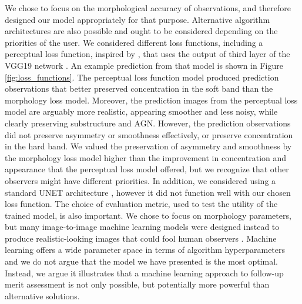 \documentclass[twocolumn, 11pt]{aastex63}%
\begin{document}
We chose to focus on the morphological accuracy of observations, and therefore designed our model appropriately for that purpose. Alternative algorithm architectures are also possible and ought to be considered depending on the priorities of the user. We considered different loss functions, including a perceptual loss function, inspired by \citet{ploss}, that uses the output of third layer of the VGG19 network \citep{VGG19}. An example prediction from that model is shown in Figure \ref{fig:loss_functions}. The perceptual loss function model produced prediction observations that better preserved concentration in the soft band than the morphology loss model. Moreover, the prediction images from the perceptual loss model are arguably more realistic, appearing smoother and less noisy, while clearly preserving substructure and AGN. However, the prediction observations did not preserve asymmetry or smoothness effectively, or preserve concentration in the hard band. We valued the preservation of asymmetry and smoothness by the morphology loss model higher than the improvement in concentration and appearance that the perceptual loss model offered, but we recognize that other observers might have different priorities. In addition, we considered using a standard UNET architecture \citep{UNET}, however it did not function well with our chosen loss function. The choice of evaluation metric, used to test the utility of the trained model, is also important. We chose to focus on morphology parameters, but many image-to-image machine learning models were designed instead to produce realistic-looking images that could fool human observers \citep[see][for examples of different image accuracy metrics, including human evaluation]{Dahl_2017}. Machine learning offers a wide parameter space in terms of algorithm hyperparameters and we do not argue that the model we have presented is the most optimal. Instead, we argue it illustrates that a machine learning approach to follow-up merit assessment is not only possible, but potentially more powerful than alternative solutions.
\end{document}
